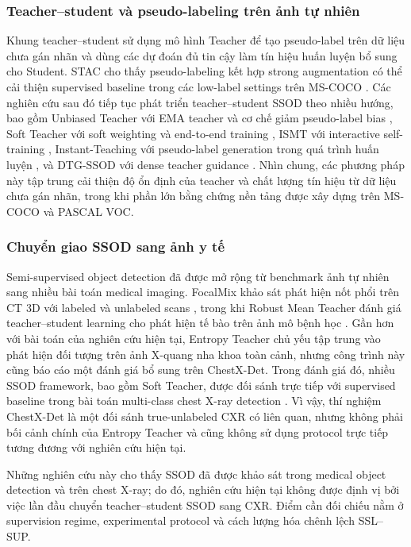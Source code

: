 \documentclass[pdflatex,sn-mathphys-num]{sn-jnl}%
\theoremstyle{thmstyleone}%
\theoremstyle{thmstyletwo}%
\theoremstyle{thmstylethree}%
\begin{document}
\subsubsection*{Teacher--student và pseudo-labeling trên ảnh tự nhiên}
Khung teacher--student sử dụng mô hình Teacher để tạo pseudo-label trên dữ liệu
chưa gán nhãn và dùng các dự đoán đủ tin cậy làm tín hiệu huấn luyện bổ sung cho
Student. STAC cho thấy pseudo-labeling kết hợp strong augmentation có thể cải
thiện supervised baseline trong các low-label settings trên MS-COCO
\cite{sohn2020simple}. Các nghiên cứu sau đó tiếp tục phát triển teacher--student
SSOD theo nhiều hướng, bao gồm Unbiased Teacher với EMA teacher và cơ chế giảm
pseudo-label bias \cite{liu2021unbiased}, Soft Teacher với soft weighting và
end-to-end training \cite{xu2021end}, ISMT với interactive self-training
\cite{yang2021interactive}, Instant-Teaching với pseudo-label generation trong
quá trình huấn luyện \cite{feng2021instant}, và DTG-SSOD với dense teacher
guidance \cite{li2022dtg}. Nhìn chung, các phương pháp này tập trung cải thiện
độ ổn định của teacher và chất lượng tín hiệu từ dữ liệu chưa gán nhãn, trong
khi phần lớn bằng chứng nền tảng được xây dựng trên MS-COCO và PASCAL VOC.
 
\subsubsection*{Chuyển giao SSOD sang ảnh y tế}
Semi-supervised object detection đã được mở rộng từ benchmark ảnh tự nhiên sang
nhiều bài toán medical imaging. FocalMix khảo sát phát hiện nốt phổi trên CT 3D
với labeled và unlabeled scans \cite{wang2020focalmix}, trong khi Robust Mean
Teacher đánh giá teacher--student learning cho phát hiện tế bào trên ảnh mô bệnh
học \cite{wen2024robust}. Gần hơn với bài toán của nghiên cứu hiện tại, Entropy
Teacher chủ yếu tập trung vào phát hiện đối tượng trên ảnh X-quang nha khoa toàn
cảnh, nhưng công trình này cũng báo cáo một đánh giá bổ sung trên ChestX-Det.
Trong đánh giá đó, nhiều SSOD framework, bao gồm Soft Teacher, được đối sánh
trực tiếp với supervised baseline trong bài toán multi-class chest X-ray
detection \cite{zhu2025entropy}. Vì vậy, thí nghiệm ChestX-Det là một đối sánh
true-unlabeled CXR có liên quan, nhưng không phải bối cảnh chính của Entropy
Teacher và cũng không sử dụng protocol trực tiếp tương đương với nghiên cứu
hiện tại.

Những nghiên cứu này cho thấy SSOD đã được khảo sát trong medical object
detection và trên chest X-ray; do đó, nghiên cứu hiện tại không được định vị
bởi việc lần đầu chuyển teacher--student SSOD sang CXR. Điểm cần đối chiếu nằm
ở supervision regime, experimental protocol và cách lượng hóa chênh lệch
SSL--SUP.
\end{document}
